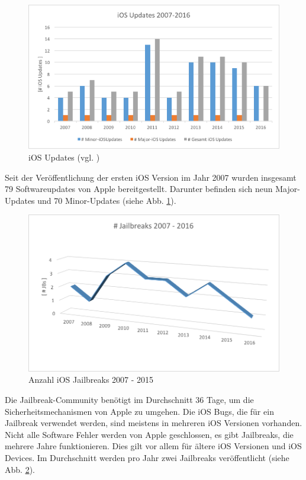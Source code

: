 \begin{figure}[ht!]
        \centering
                \includegraphics[scale=0.9]{Bilder/iOSUpdates1}
        \caption{iOS Updates (vgl. \cite{Apple[7]}) \protect\footnotemark}
        	\label{fig:iOS Software Updates}
\end{figure}

Seit der Veröffentlichung der ersten iOS Version im Jahr 2007 wurden insgesamt 79 Softwareupdates von Apple bereitgestellt. Darunter befinden sich neun Major-Updates und 70  Minor-Updates (siehe Abb. \ref{fig:iOS Software Updates}).\par 
\begin{figure}[htbp!]
        \centering
                \includegraphics[scale=0.85]{Bilder/AnzahlJB}
        \caption{Anzahl iOS Jailbreaks 2007 - 2015 \protect\footnotemark}
        	\label{fig:iOS Jailbreak}
\end{figure}


Die Jailbreak-Community benötigt im Durchschnitt 36 Tage, um die Sicherheitsmechanismen von Apple zu umgehen. Die iOS Bugs, die für ein Jailbreak verwendet werden, sind meistens in mehreren iOS Versionen vorhanden. Nicht alle Software Fehler werden von Apple geschlossen, es gibt Jailbreaks, die mehrere Jahre funktionieren. Dies gilt vor allem für ältere iOS Versionen und iOS Devices. Im Durchschnitt werden pro Jahr zwei Jailbreaks veröffentlicht (siehe Abb. \ref{fig:iOS Jailbreak}).
\newpage

